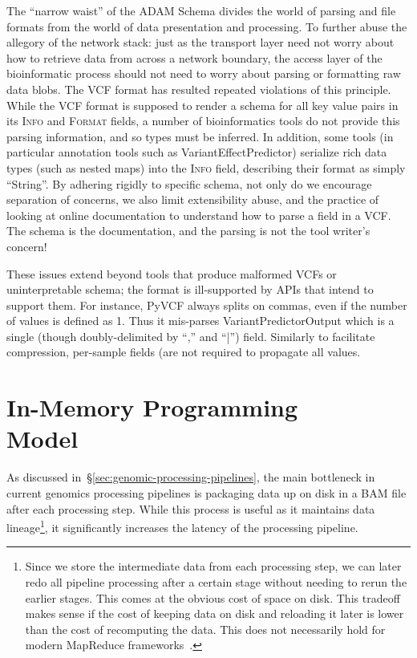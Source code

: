 \documentclass[10pt,twocolumn]{article}
\theoremstyle{plain}
\begin{document}
The ``narrow waist'' of the ADAM Schema divides the world of parsing and file formats from the world of data presentation and processing.
To further abuse the allegory of the network stack: just as the transport layer need not worry about how to retrieve data from across a network
boundary, the access layer of the bioinformatic process should not need to worry about parsing or formatting raw data blobs. The VCF format
has resulted repeated violations of this principle. While the VCF format is supposed to render a schema for all key value pairs in its \textsc{Info}
and \textsc{Format} fields, a number of bioinformatics tools do not provide this parsing information, and so types must be inferred. In addition,
some tools (in particular annotation tools such as VariantEffectPredictor\cite{vep}) serialize rich data types (such as nested maps) into the
\textsc{Info} field, describing their format as simply ``String''. By adhering rigidly to specific schema, not only do we encourage separation of
concerns, we also limit extensibility abuse, and the practice of looking at online documentation to understand how to parse a field in a VCF.
The schema is the documentation, and the parsing is not the tool writer's concern!

These issues extend beyond tools that produce malformed VCFs or uninterpretable schema; the format is ill-supported by APIs that intend to
support them. For instance, PyVCF always splits on commas, even if the number of values is defined as 1. Thus it mis-parses VariantPredictorOutput
which is a single (though doubly-delimited by ``,'' and ``|'') field. Similarly to facilitate compression, per-sample fields (are not required to propagate all values. 

\section{In-Memory Programming\\Model}
\label{sec:in-memory-programming-model}

As discussed in~\S\ref{sec:genomic-processing-pipelines}, the main bottleneck in current genomics processing pipelines is
packaging data up on disk in a BAM file after each processing step. While this process is useful as it maintains data
lineage\footnote{Since we store the intermediate data from each processing step, we can later redo all pipeline processing
after a certain stage without needing to rerun the earlier stages. This comes at the obvious cost of space on disk. This tradeoff
makes sense if the cost of keeping data on disk and reloading it later is lower than the cost of recomputing the data. This
does not necessarily hold for modern MapReduce frameworks~\cite{zaharia12}.}, it significantly increases the latency of the
processing pipeline.
\end{document}

